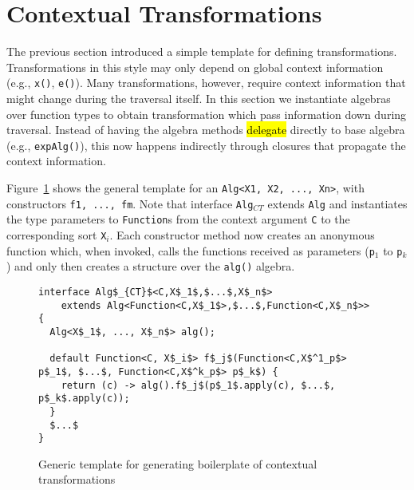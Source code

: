 \section{Contextual Transformations}\label{sec:contexttrans}

The previous section introduced a simple template for defining transformations.
Transformations in this style may only depend on global context information (e.g., \lstinline{x()}, \lstinline{e()}).
Many transformations, however, require context information that might change during the traversal itself.
In this section we instantiate algebras over function types to obtain transformation which pass information down during traversal.
Instead of having the algebra methods \hl{delegate} directly to base algebra (e.g., \lstinline{expAlg()}), this now happens indirectly through closures that propagate the context information.

Figure~\ref{ctxTrafoTemplate} shows the general template for an \lstinline{Alg<X1, X2, ..., Xn>}, with constructors \lstinline{f1, ..., fm}.
Note that interface \lstinline{Alg}$_{CT}$ extends \lstinline{Alg} and instantiates the type parameters to \lstinline{Function}s from the context argument \lstinline{C} to the corresponding sort \lstinline{X}$_i$.
Each constructor method now creates an anonymous function which, when invoked, calls the functions received as parameters (\lstinline{p}$_1$ to \lstinline{p}$_k$) and only then creates a structure over the \lstinline{alg()} algebra.

\begin{figure}[t]
\nocaptionrule
\begin{lstlisting}[mathescape=true]
interface Alg$_{CT}$<C,X$_1$,$...$,X$_n$>
    extends Alg<Function<C,X$_1$>,$...$,Function<C,X$_n$>> {
  Alg<X$_1$, ..., X$_n$> alg();

  default Function<C, X$_i$> f$_j$(Function<C,X$^1_p$> p$_1$, $...$, Function<C,X$^k_p$> p$_k$) {
    return (c) -> alg().f$_j$(p$_1$.apply(c), $...$, p$_k$.apply(c));
  }
  $...$
}
\end{lstlisting}
\caption{Generic template for generating boilerplate of contextual transformations}
\label{ctxTrafoTemplate}
\end{figure}


